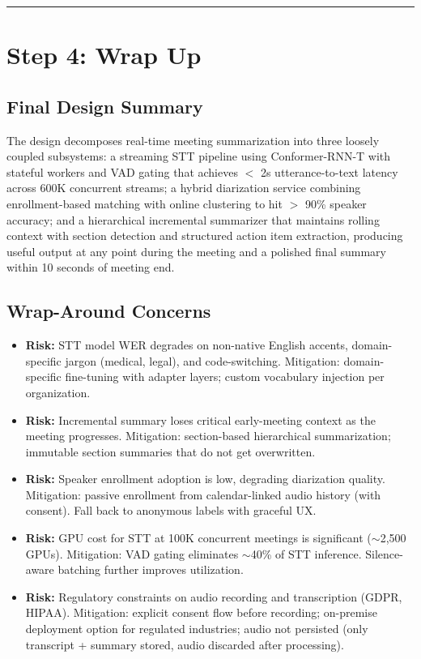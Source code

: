 \bigskip\hrule\bigskip

\section*{Step 4: Wrap Up}

\subsection*{Final Design Summary}

The design decomposes real-time meeting summarization into three loosely coupled subsystems: a streaming STT pipeline using Conformer-RNN-T with stateful workers and VAD gating that achieves $<$ 2s utterance-to-text latency across 600K concurrent streams; a hybrid diarization service combining enrollment-based matching with online clustering to hit $>$ 90\% speaker accuracy; and a hierarchical incremental summarizer that maintains rolling context with section detection and structured action item extraction, producing useful output at any point during the meeting and a polished final summary within 10 seconds of meeting end.

\subsection*{Wrap-Around Concerns}

\begin{itemize}
  \item \textbf{Risk:} STT model WER degrades on non-native English accents, domain-specific jargon (medical, legal), and code-switching. Mitigation: domain-specific fine-tuning with adapter layers; custom vocabulary injection per organization.
  \item \textbf{Risk:} Incremental summary loses critical early-meeting context as the meeting progresses. Mitigation: section-based hierarchical summarization; immutable section summaries that do not get overwritten.
  \item \textbf{Risk:} Speaker enrollment adoption is low, degrading diarization quality. Mitigation: passive enrollment from calendar-linked audio history (with consent). Fall back to anonymous labels with graceful UX.
  \item \textbf{Risk:} GPU cost for STT at 100K concurrent meetings is significant ($\sim$2,500 GPUs). Mitigation: VAD gating eliminates $\sim$40\% of STT inference. Silence-aware batching further improves utilization.
  \item \textbf{Risk:} Regulatory constraints on audio recording and transcription (GDPR, HIPAA). Mitigation: explicit consent flow before recording; on-premise deployment option for regulated industries; audio not persisted (only transcript + summary stored, audio discarded after processing).
\end{itemize}

